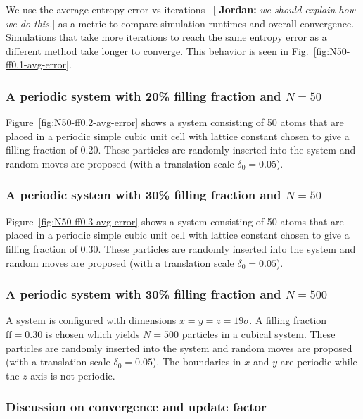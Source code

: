\documentclass[letterpaper,twocolumn,amsmath,amssymb,pre,aps,10pt]{revtex4-1}
\newcommand{\blue}[1]{{\bf \color{blue} #1}}
\newcommand{\jpsays}[1]{{\color{red} [\blue{Jordan:} \emph{#1}]}}
\begin{document}
We use the average entropy error vs iterations~\jpsays{we should
explain how we do this.} as a metric to compare simulation runtimes and
overall convergence.  Simulations that take more iterations to reach
the same entropy error as a different method take longer to converge.
This behavior is seen in Fig.~\ref{fig:N50-ff0.1-avg-error}.

\subsubsection{A periodic system with 20\% filling fraction and $N = 50$}

Figure~\ref{fig:N50-ff0.2-avg-error} shows a system consisting of 50 atoms
that are placed in a periodic simple cubic unit cell with lattice constant
chosen to give a filling fraction of 0.20.  These particles are
randomly inserted into the system and random moves are proposed (with
a translation scale $\delta_0 = 0.05$).

\subsubsection{A periodic system with 30\% filling fraction and $N = 50$}

Figure~\ref{fig:N50-ff0.3-avg-error} shows a system consisting of 50 atoms
that are placed in a periodic simple cubic unit cell with lattice constant
chosen to give a filling fraction of 0.30.  These particles are
randomly inserted into the system and random moves are proposed (with
a translation scale $\delta_0 = 0.05$).

\subsubsection{A periodic system with 30\% filling fraction and $N = 500$}

A system is configured with dimensions $x = y = z = 19\sigma$.  A
filling fraction $\text{ff} = 0.30$ is chosen which yields $N = 500$
particles in a cubical system.  These particles are randomly inserted
into the system and random moves are proposed (with a translation scale
$\delta_0 = 0.05$). The boundaries in $x$ and $y$ are periodic while
the $z$-axis is not periodic.

\subsubsection{Discussion on convergence and update factor}
\end{document}
